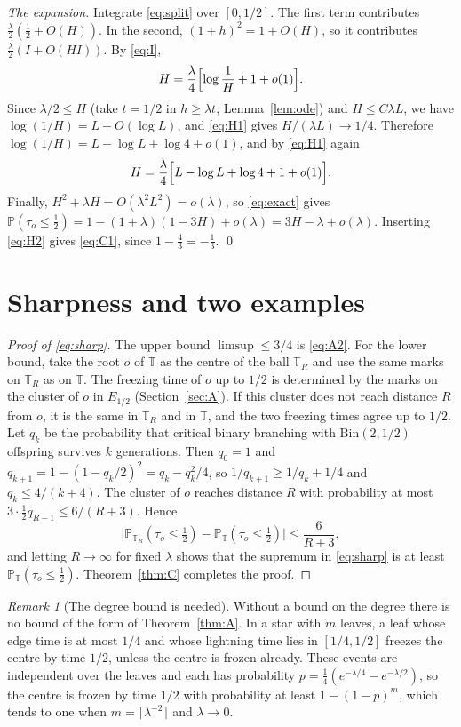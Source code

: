 \documentclass[11pt]{amsart}
\theoremstyle{remark}
\newtheorem{remark}[theorem]{Remark}
\numberwithin{equation}{section}
\newcommand{\T}{\mathbb{T}}
\newcommand{\PP}{\mathbb{P}}
\begin{document}
\emph{The expansion.} Integrate \eqref{eq:split} over $[0,1/2]$. The
first term contributes $\frac\lambda2(\frac12+O(H))$. In the second,
$(1+h)^2=1+O(H)$, so it contributes $\frac\lambda2(I+O(HI))$. By
\eqref{eq:I},
\begin{equation}\label{eq:H1}
H=\frac\lambda4\Bigl[\log\frac1H+1+o(1)\Bigr].
\end{equation}
Since $\lambda/2\le H$ (take $t=1/2$ in $h\ge\lambda t$, Lemma~\ref{lem:ode})
and $H\le C\lambda L$, we have $\log(1/H)=L+O(\log L)$, and
\eqref{eq:H1} gives $H/(\lambda L)\to1/4$. Therefore
$\log(1/H)=L-\log L+\log4+o(1)$, and by \eqref{eq:H1} again
\begin{equation}\label{eq:H2}
H=\frac\lambda4\Bigl[L-\log L+\log4+1+o(1)\Bigr].
\end{equation}
Finally, $H^2+\lambda H=O(\lambda^2L^2)=o(\lambda)$, so \eqref{eq:exact}
gives
$\PP(\tau_o\le\frac12)=1-(1+\lambda)(1-3H)+o(\lambda)=3H-\lambda+o(\lambda)$.
Inserting \eqref{eq:H2} gives \eqref{eq:C1}, since $1-\frac43=-\frac13$.
\qed

\section{Sharpness and two examples}\label{sec:sharp}

\begin{proof}[Proof of \eqref{eq:sharp}]
The upper bound $\limsup\le3/4$ is \eqref{eq:A2}. For the lower bound,
take the root $o$ of $\T$ as the centre of the ball $\T_R$
and use the same marks on $\T_R$ as on $\T$. The freezing time of
$o$ up to $1/2$ is determined by the marks on the cluster of $o$ in
$E_{1/2}$ (Section~\ref{sec:A}). If this cluster does not reach distance
$R$ from $o$, it is the same in $\T_R$ and in $\T$, and the two
freezing times agree up to $1/2$. Let $q_k$ be the probability that
critical binary branching with $\mathrm{Bin}(2,1/2)$ offspring survives
$k$ generations. Then $q_0=1$ and $q_{k+1}=1-(1-q_k/2)^2=q_k-q_k^2/4$, so
$1/q_{k+1}\ge1/q_k+1/4$ and $q_k\le4/(k+4)$. The cluster of $o$ reaches
distance $R$ with probability at most $3\cdot\frac12 q_{R-1}\le
6/(R+3)$. Hence
\[
\bigl|\PP_{\T_R}(\tau_o\le\tfrac12)-\PP_{\T}(\tau_o\le\tfrac12)\bigr|\le\frac6{R+3},
\]
and letting $R\to\infty$ for fixed $\lambda$ shows that the supremum in
\eqref{eq:sharp} is at least $\PP_\T(\tau_o\le\frac12)$. Theorem~\ref{thm:C}
completes the proof.
\end{proof}

\begin{remark}[The degree bound is needed]
Without a bound on the degree there is no bound of the form of
Theorem~\ref{thm:A}. In a star with $m$ leaves, a leaf whose edge time is
at most $1/4$ and whose lightning time lies in $[1/4,1/2]$ freezes the
centre by time $1/2$, unless the centre is frozen already. These events
are independent over the leaves and each has probability
$p=\frac14(e^{-\lambda/4}-e^{-\lambda/2})$, so the centre is frozen by
time $1/2$ with probability at least $1-(1-p)^m$, which tends to one
when $m=\lceil\lambda^{-2}\rceil$ and $\lambda\to0$.
\end{remark}
\end{document}
